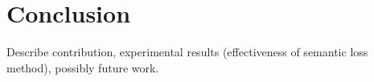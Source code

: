 \section{Conclusion}
Describe contribution, experimental results (effectiveness of semantic loss method), possibly future work.
